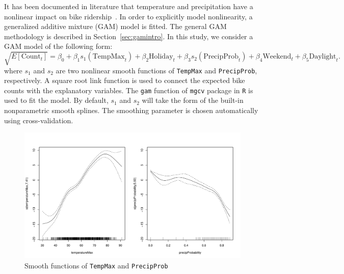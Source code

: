\documentclass [11pt, proquest] {uwthesis}[2015/03/03]
\begin{document}
It has been documented in literature that temperature and precipitation have a nonlinear impact on bike ridership~\cite{Richardson00,Rose07}. In order to explicitly model nonlinearity, a generalized additive mixture (GAM) model is fitted. The general GAM methodology is described in Section~\ref{sec:gamintro}. In this study, we consider a GAM model of the following form:
\begin{equation}
\sqrt{E[\text{Count}_t]} = \beta_0 + \beta_1 s_1(\text{TempMax}_t) + \beta_2 \text{Holiday}_t + \beta_3 s_2(\text{PrecipProb}_t) + \beta_4 \text{Weekend}_t + \beta_5 \text{Daylight}_t. \label{eqref:gamodel}
\end{equation}
where $s_1$ and $s_2$ are two nonlinear smooth functions of \texttt{TempMax} and \texttt{PrecipProb}, respectively. A square root link function is used to connect the expected bike counts with the explanatory variables. The \texttt{gam} function of \texttt{mgcv} package in \texttt{R} is used to fit the model. By default, $s_1$ and $s_2$ will take the form of the built-in nonparametric smooth splines. The smoothing parameter is chosen automatically using cross-validation.



\begin{figure}
\centering
   \includegraphics[width=1\textwidth]{figures/gam.pdf} 
\vspace{-1cm}
  \caption{Smooth functions of \texttt{TempMax} and \texttt{PrecipProb}}
  \label{fig:smooth}
\vspace{-1.05cm}
\end{figure}
\end{document}
